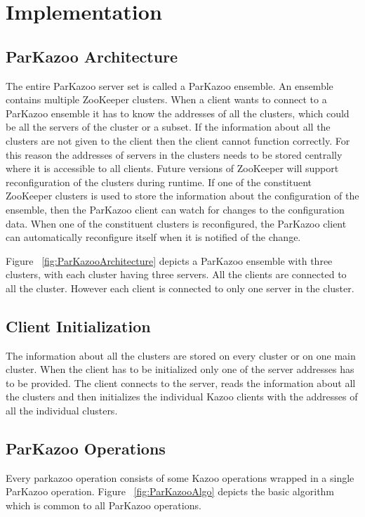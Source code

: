 \chapter{Implementation}

\section{ParKazoo Architecture}
  The entire ParKazoo server set is called a ParKazoo ensemble. An ensemble contains multiple ZooKeeper clusters. When a client wants to connect to a ParKazoo ensemble it has to know the addresses of all the clusters, which could be all the servers of the cluster or a subset. If the information about all the clusters are not given to the client then the client cannot function correctly. For this reason the addresses of servers in the clusters needs to be stored centrally where it is accessible to all clients. Future versions of ZooKeeper will support reconfiguration of the clusters during runtime. If one of the constituent ZooKeeper clusters is used to store the information about the configuration of the ensemble, then the ParKazoo client can watch for changes to the configuration data. When one of the constituent clusters is reconfigured, the ParKazoo client can automatically reconfigure itself when it is notified of the change. 

\addvspace{1em}

\addvspace{1em}
  	Figure ~\ref{fig:ParKazooArchitecture} depicts a ParKazoo ensemble with three clusters, with each cluster having three servers. All the clients are connected to all the cluster. However each client is connected to only one server in the cluster.
  	
\section{Client Initialization}
    The information about all the clusters are stored on every cluster or on one main cluster. When the client has to be initialized only one of the server addresses has to be provided. The client connects to the server, reads the information about all the clusters and then initializes the individual Kazoo clients with the addresses of all the individual clusters.

\section{ParKazoo Operations}
Every parkazoo operation consists of some Kazoo operations wrapped in a single ParKazoo operation. Figure ~\ref{fig:ParKazooAlgo} depicts the basic algorithm which is common to all ParKazoo operations.


